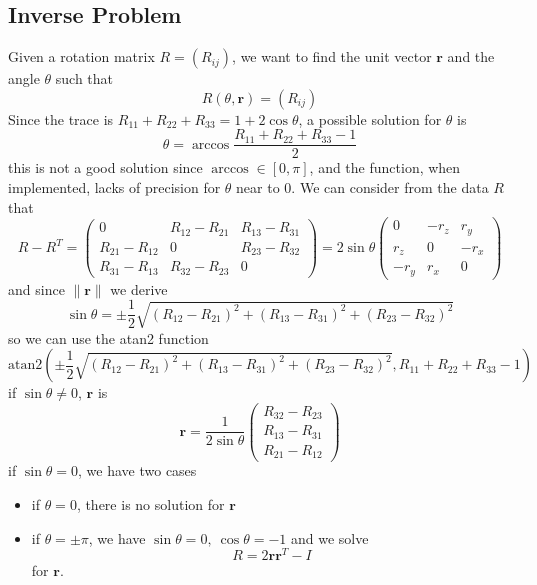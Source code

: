 \documentclass[10pt, letterpaper]{report}
\begin{document}
\subsection{Inverse Problem}
Given a rotation matrix $R=(R_{ij})$, we want to find the unit vector $\mathbf r$ and the angle $\theta$ such that\begin{equation}
    R(\theta,\mathbf r)=(R_{ij})
\end{equation}
Since the trace is 
$R_{11}+R_{22}+R_{33}=1+2\cos\theta$, a possible solution for $\theta$ is\begin{equation}
    \theta=\arccos\frac{R_{11}+R_{22}+R_{33}-1}{2}
\end{equation}
this is not a good solution since $\arccos\in[0,\pi]$, and the function, when implemented, lacks of precision for $\theta$ near to 0. We can consider from the data $R$ that\begin{equation}
    R - R^{T} = \begin{pmatrix}
0 & R_{12} - R_{21} & R_{13} - R_{31} \\
R_{21} - R_{12} & 0 & R_{23} - R_{32} \\
R_{31} - R_{13} & R_{32} - R_{23} & 0
\end{pmatrix} = 2 \sin \theta \begin{pmatrix}
0 & -r_{z} & r_{y} \\
r_{z} & 0 & -r_{x} \\
-r_{y} & r_{x} & 0
\end{pmatrix}
\end{equation}
and since $\|\mathbf r \|$ we derive\begin{equation}
    \sin \theta = \pm \frac{1}{2} \sqrt{(R_{12} - R_{21})^2 + (R_{13} - R_{31})^2 + (R_{23} - R_{32})^2}
\end{equation}
so we can use the atan2 function\begin{equation}
    \text{atan2}(\pm \frac{1}{2} \sqrt{(R_{12} - R_{21})^2 + (R_{13} - R_{31})^2 + (R_{23} - R_{32})^2},R_{11}+R_{22}+R_{33}-1
    )
\end{equation}
if $\sin\theta\ne 0$, $\mathbf r$ is\begin{equation}
    \mathbf r=\frac{1}{2\sin\theta}\begin{pmatrix}
        R_{32}-R_{23}\\ 
        R_{13}-R_{31}\\
        R_{21}-R_{12}
    \end{pmatrix}
\end{equation}
if $\sin\theta=0$, we have two cases\begin{itemize}
    \item if $\theta=0$, there is no solution for $\mathbf r$
    \item if $\theta=\pm\pi$, we have $\sin\theta=0, \ \cos\theta=-1$ and we solve\begin{equation}
        R=2\mathbf r\mathbf r^T-I
    \end{equation}
    for $\mathbf r$.
\end{itemize}
\end{document}
